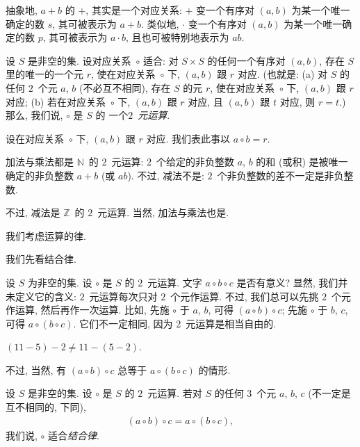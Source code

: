 \documentclass[../libro.tex]{subfiles}
\begin{document}
抽象地, \(a + b\) 的 \(+\),
其实是一个对应关系:
\(+\) 变一个有序对 \((a, b)\)
为某一个唯一确定的数 \(s\),
其可被表示为 \(a + b\).
类似地, \(\cdot\) 变一个有序对 \((a, b)\)
为某一个唯一确定的数 \(p\),
其可被表示为 \(a \cdot b\),
且也可被特别地表示为 \(ab\).

\begin{definition}
    设 \(S\) 是非空的集.
    设对应关系~\(\circ\) 适合:
    对 \(S \times S\) 的任何一个有序对 \((a, b)\),
    存在 \(S\) 里的唯一的一个元 \(r\),
    使在对应关系~\(\circ\) 下,
    \((a, b)\) 跟 \(r\) 对应.
    (也就是: %
    (a)
    对 \(S\) 的任何 \(2\)~个元 \(a\), \(b\)
    (不必互不相同),
    存在 \(S\) 的元 \(r\),
    使在对应关系~\(\circ\) 下,
    \((a, b)\) 跟 \(r\) 对应;
    (b)
    若在对应关系~\(\circ\) 下,
    \((a, b)\) 跟 \(r\) 对应,
    且 \((a, b)\) 跟 \(t\) 对应,
    则 \(r = t\).) %
    那么, 我们说, \(\circ\) 是 \(S\) 的%
    一个\emph{\(2\)~元运算}.

    设在对应关系~\(\circ\) 下,
    \((a, b)\) 跟 \(r\) 对应.
    我们表此事以 \(a \circ b = r\).
\end{definition}

\begin{example}
    加法与乘法都是 \(\mathbb{N}\)~的 \(2\)~元运算:
    \(2\)~个给定的非负整数 \(a\), \(b\)
    的和 (或积) 是被唯一确定的非负整数
    \(a + b\)
    (或 \(ab\)).
    不过, 减法不是:
    \(2\)~个非负整数的差不一定是非负整数.

    不过, 减法是 \(\mathbb{Z}\)~的 \(2\)~元运算.
    当然, 加法与乘法也是.
\end{example}

我们考虑运算的律.

我们先看结合律.

设 \(S\) 为非空的集.
设 \(\circ\) 是 \(S\) 的 \(2\)~元运算.
文字 \(a \circ b \circ c\) 是否有意义?
显然, 我们并未定义它的含义:
\(2\)~元运算每次只对 \(2\)~个元作运算.
不过, 我们总可以先挑 \(2\)~个元作运算,
然后再作一次运算.
比如, 先施 \(\circ\) 于 \(a\), \(b\),
可得 \((a \circ b) \circ c\);
先施 \(\circ\) 于 \(b\), \(c\),
可得 \(a \circ (b \circ c)\).
它们不一定相同,
因为 \(2\)~元运算是相当自由的.

\begin{example}
    \(
        (11 - 5) - 2 \neq 11 - (5 - 2).
    \)
\end{example}

不过, 当然, 有 \((a \circ b) \circ c\)
总等于 \(a \circ (b \circ c)\)
的情形.

\begin{definition}
    设 \(S\) 是非空的集.
    设 \(\circ\) 是 \(S\) 的 \(2\)~元运算.
    若对 \(S\) 的任何 \(3\)~个元 \(a\), \(b\), \(c\)
    (不一定是互不相同的, 下同),
    \begin{align*}
        (a \circ b) \circ c = a \circ (b \circ c),
    \end{align*}
    我们说, \(\circ\) 适合\emph{结合律}.
\end{definition}
\end{document}
